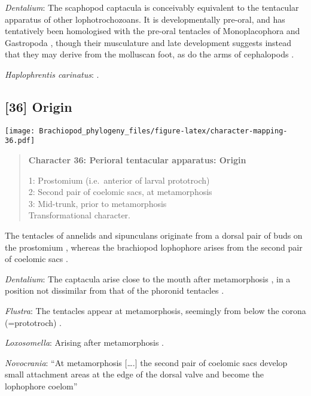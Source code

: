 \documentclass[openany]{book}
\theoremstyle{definition}
\theoremstyle{definition}
\theoremstyle{definition}
\theoremstyle{remark}
\begin{document}
\hypertarget{Dentalium-coding-35}{}
\emph{Dentalium}: The scaphopod captacula is conceivably equivalent to
the tentacular apparatus of other lophotrochozoans. It is
developmentally pre-oral, and has tentatively been homologised with the
pre-oral tentacles of Monoplacophora and Gastropoda \citep{Steiner1992},
though their musculature and late development suggests instead that they
may derive from the molluscan foot, as do the arms of cephalopods
\citep{Wanninger2002M}.

\hypertarget{Haplophrentis_carinatus-coding-35}{}
\emph{Haplophrentis carinatus}: \citet{Moysiuk2017Hyolithsare}.

\subsection*{{[}36{]} Origin}\label{origin}

\texttt{[image: Brachiopod\_phylogeny\_files/figure-latex/character-mapping-36.pdf]}

\begin{quote}
\textbf{Character 36: Perioral tentacular apparatus: Origin}

1: Prostomium (i.e.~anterior of larval prototroch)\\
2: Second pair of coelomic sacs, at metamorphosis\\
3: Mid-trunk, prior to metamorphosis\\
Transformational character.
\end{quote}

The tentacles of annelids and sipunculans originate from a dorsal pair
of buds on the prostomium \citep{Adrianov2006}, whereas the brachiopod
lophophore arises from the second pair of coelomic sacs
\citep{Nielsen1991}.

\hypertarget{Dentalium-coding-36}{}
\emph{Dentalium}: The captacula arise close to the mouth after
metamorphosis \citep{Wanninger2002M}, in a position not dissimilar from
that of the phoronid tentacles \citep{Santagata2004}.

\hypertarget{Flustra-coding-36}{}
\emph{Flustra}: The tentacles appear at metamorphosis, seemingly from
below the corona (=prototroch) \citep{Young2002}.

\hypertarget{Loxosomella-coding-36}{}
\emph{Loxosomella}: Arising after metamorphosis \citep{Nielsen1971}.

\hypertarget{Novocrania-coding-36}{}
\emph{Novocrania}: ``At metamorphosis {[}\ldots{}.{]} the second pair of
coelomic sacs develop small attachment areas at the edge of the dorsal
valve and become the lophophore coelom'' \citep{Nielsen1991}
\end{document}
